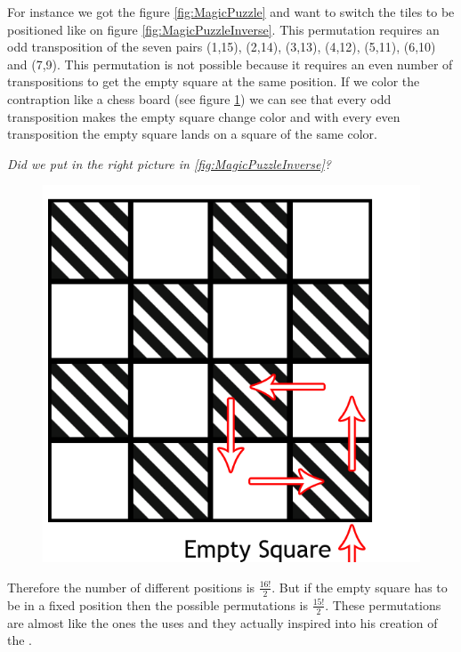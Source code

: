 For instance we got the figure \ref{fig:MagicPuzzle} and want to switch the tiles to be positioned like on figure \ref{fig:MagicPuzzleInverse}. This permutation requires an odd transposition of the seven pairs (1,15), (2,14), (3,13), (4,12), (5,11), (6,10) and (7,9). This permutation is not possible because it requires an even number of transpositions to get the empty square at the same position. If we color the contraption like a chess board (see figure \ref{fig:Chess}) we can see that every odd transposition makes the empty square change color and with every even transposition the empty square lands on a square of the same color.

\textit{Did we put in the right picture in \ref{fig:MagicPuzzleInverse}?}

\begin{figure}[!h]
\begin{center}
\includegraphics[scale=0.2]{input/pics/MagicPuzzle(EmptySquare).png}
\caption{}
\label{fig:Chess}
\end{center}
\end{figure}

Therefore the number of different positions is $\frac{16!}{2}$. But if the empty square has to be in a fixed position then the possible permutations is $\frac{15!}{2}$. These permutations are almost like the ones the \rubik{} uses and they actually inspired \erno{} into his creation of the \rubik{} \cite[pp. 7-9]{Singmaster98} \cite[p. 48]{Larsen81}.